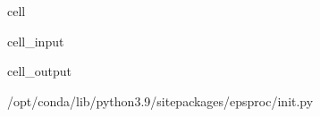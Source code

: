 \documentclass[letterpaper,table,10pt,english]{jupyterBook}
\begin{document}
\begin{sphinxuseclass}{cell}\begin{sphinxVerbatimInput}

\begin{sphinxuseclass}{cell_input}
\begin{sphinxVerbatim}[commandchars=\\\{\}]
   
   
\end{sphinxVerbatim}

\end{sphinxuseclass}\end{sphinxVerbatimInput}
\begin{sphinxVerbatimOutput}

\begin{sphinxuseclass}{cell_output}
\begin{sphinxVerbatim}[commandchars=\\\{\}]
\PYGZsq{}/opt/conda/lib/python3.9/site\PYGZhy{}packages/epsproc/\PYGZus{}\PYGZus{}init\PYGZus{}\PYGZus{}.py\PYGZsq{}
\end{sphinxVerbatim}

\end{sphinxuseclass}\end{sphinxVerbatimOutput}

\end{sphinxuseclass}
\end{document}
